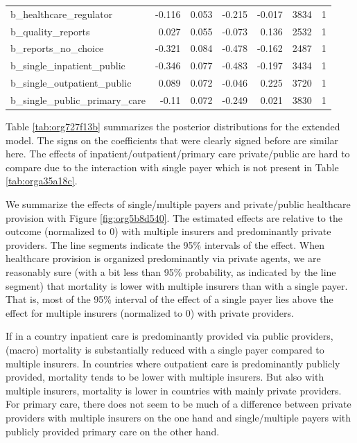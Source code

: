 \documentclass[12pt,english,a4paper]{article}
\begin{document}
\begin{table}[htbp]
\begin{tabular}{lrrrrrr}
b\_healthcare\_regulator & -0.116 & 0.053 & -0.215 & -0.017 & 3834 & 1\\
b\_quality\_reports & 0.027 & 0.055 & -0.073 & 0.136 & 2532 & 1\\
b\_reports\_no\_choice & -0.321 & 0.084 & -0.478 & -0.162 & 2487 & 1\\
b\_single\_inpatient\_public & -0.346 & 0.077 & -0.483 & -0.197 & 3434 & 1\\
b\_single\_outpatient\_public & 0.089 & 0.072 & -0.046 & 0.225 & 3720 & 1\\
b\_single\_public\_primary\_care & -0.11 & 0.072 & -0.249 & 0.021 & 3830 & 1\\
\end{tabular}
\end{table}


Table \ref{tab:org727f13b} summarizes the posterior distributions for the extended model. The signs on the coefficients that were clearly signed before are similar here. The effects of inpatient/outpatient/primary care private/public are hard to compare due to the interaction with single payer which is not present in Table \ref{tab:orga35a18c}.

We summarize the effects of single/multiple payers and private/public healthcare provision with Figure \ref{fig:org5b8d540}. The estimated effects are relative to the outcome (normalized to 0) with multiple insurers and predominantly private providers. The line segments indicate the 95\% intervals of the effect. When healthcare provision is organized predominantly via private agents, we are reasonably sure (with a bit less than 95\% probability, as indicated by the line segment) that mortality is lower with multiple insurers than with a single payer. That is, most of the 95\% interval of the effect of a single payer lies above the effect for multiple insurers (normalized to 0) with private providers.

If in a country inpatient care is predominantly provided via public providers, (macro) mortality is substantially reduced with a single payer compared to multiple insurers. In countries where outpatient care is predominantly publicly provided, mortality tends to be lower with multiple insurers. But also with multiple insurers, mortality is lower in countries with mainly private providers. For primary care, there does not seem to be much of a difference between private providers with multiple insurers on the one hand and single/multiple payers with publicly provided primary care on the other hand.
\end{document}
